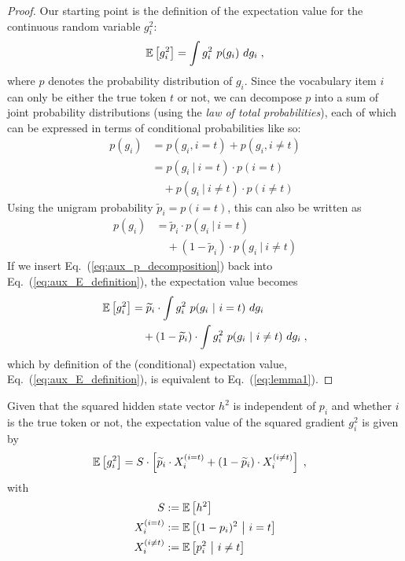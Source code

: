 \begin{proof}
Our starting point is the definition of the expectation value for the continuous random variable $g_i^2$:
\begin{align}
\mathbb{E} \left[ g_i^2 \right] = \int g_i^2 ~p(g_i) ~dg_i \; ,
\label{eq:aux_E_definition}
\end{align}
where $p$ denotes the probability distribution of $g_i$. Since the vocabulary item $i$ can only be either the true token $t$ or not, we can decompose $p$ into a sum of joint probability distributions (using the {\em law of total probabilities}), each of which can be expressed in terms of conditional probabilities like so:
\begin{align}
p(g_i) 
&= p(g_i, i=t) + p(g_i, i\neq t) \nonumber \\
&= p(g_i ~|~ i=t) \cdot p(i=t) \nonumber \\
&\quad + p(g_i ~|~ i\neq t) \cdot p(i\neq t)
\end{align}
Using the unigram probability $\widetilde p_i = p(i = t)$, this can also be written as
\begin{align}
p(g_i) 
&= \widetilde p_i \cdot p(g_i ~|~ i=t) \nonumber \\
&\quad + (1 - \widetilde p_i) \cdot p(g_i ~|~ i\neq t)
\label{eq:aux_p_decomposition}
\end{align}
If we insert Eq.~(\ref{eq:aux_p_decomposition}) back into Eq.~(\ref{eq:aux_E_definition}), the expectation value becomes
\begin{align}
\E \left[ g_i^2 \right] 
&= \widetilde p_i \cdot \int g_i^2 ~p(g_i ~|~ i=t) ~dg_i \nonumber \\
&\quad + (1 - \widetilde p_i) \cdot \int g_i^2 ~p(g_i ~|~ i\neq t) ~dg_i \;, 
\label{eq:aux_E_decomposition} %
\end{align}
which by definition of the (conditional) expectation value, Eq.~(\ref{eq:aux_E_definition}), is equivalent to Eq.~(\ref{eq:lemma1}).
\end{proof}
\begin{theorem} \label{theorem}
Given that the squared hidden state vector $h^2$ is independent of $p_i$ and whether $i$ is the true token or not, the expectation value of the squared gradient $g_i^2$ is given by
\begin{align}
\mathbb{E} \left[ g_i^2 \right] 
&= S \cdot \left[ \widetilde p_i \cdot X_i^{(i=t)} + (1 - \widetilde p_i) \cdot X_i^{(i \neq t)} \right] \; ,
\label{eq:theorem}
\end{align}
with
\begin{align}
S &:= \mathbb{E} \left[ h^2 \right] \label{eq:optimizer_second_moment_expansion_S} \\
X_i^{(i=t)} &:= \mathbb{E} \left[ (1 - p_i)^2 ~\big|~ i=t \right]
\label{eq:optimizer_second_moment_expansion_true_2} \\
X_i^{(i \neq t)} &:= \mathbb{E} \left[ p_i^2 ~\big|~ i \neq t \right]
\label{eq:optimizer_second_moment_expansion_false_2}
\end{align}
\end{theorem}

